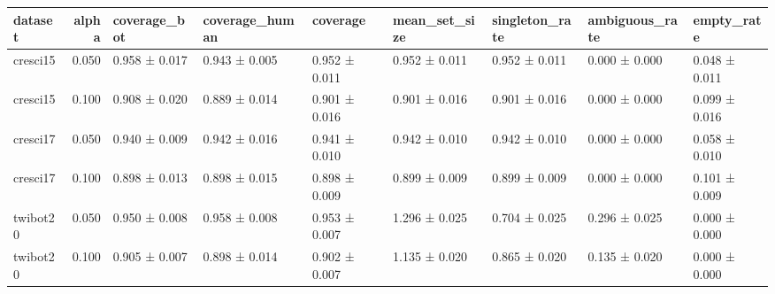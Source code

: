 \begin{tabular}{lrlllllll}
\toprule
dataset & alpha & coverage_bot & coverage_human & coverage & mean_set_size & singleton_rate & ambiguous_rate & empty_rate \\
\midrule
cresci15 & 0.050 & 0.958 ± 0.017 & 0.943 ± 0.005 & 0.952 ± 0.011 & 0.952 ± 0.011 & 0.952 ± 0.011 & 0.000 ± 0.000 & 0.048 ± 0.011 \\
cresci15 & 0.100 & 0.908 ± 0.020 & 0.889 ± 0.014 & 0.901 ± 0.016 & 0.901 ± 0.016 & 0.901 ± 0.016 & 0.000 ± 0.000 & 0.099 ± 0.016 \\
cresci17 & 0.050 & 0.940 ± 0.009 & 0.942 ± 0.016 & 0.941 ± 0.010 & 0.942 ± 0.010 & 0.942 ± 0.010 & 0.000 ± 0.000 & 0.058 ± 0.010 \\
cresci17 & 0.100 & 0.898 ± 0.013 & 0.898 ± 0.015 & 0.898 ± 0.009 & 0.899 ± 0.009 & 0.899 ± 0.009 & 0.000 ± 0.000 & 0.101 ± 0.009 \\
twibot20 & 0.050 & 0.950 ± 0.008 & 0.958 ± 0.008 & 0.953 ± 0.007 & 1.296 ± 0.025 & 0.704 ± 0.025 & 0.296 ± 0.025 & 0.000 ± 0.000 \\
twibot20 & 0.100 & 0.905 ± 0.007 & 0.898 ± 0.014 & 0.902 ± 0.007 & 1.135 ± 0.020 & 0.865 ± 0.020 & 0.135 ± 0.020 & 0.000 ± 0.000 \\
\bottomrule
\end{tabular}
